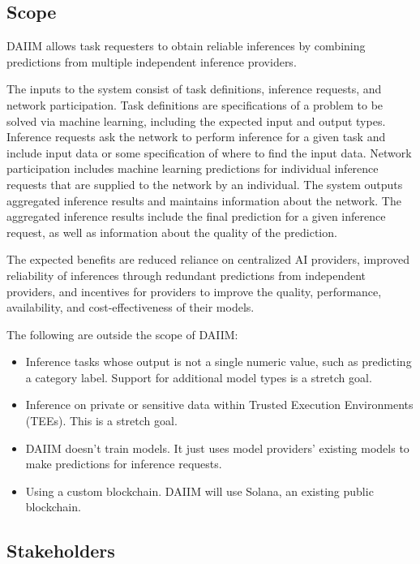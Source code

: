 \documentclass[12pt]{article}
\begin{document}
\subsection{Scope}

DAIIM allows task requesters to obtain reliable inferences by combining predictions from multiple independent inference providers.

The inputs to the system consist of task definitions, inference requests, and network participation.
Task definitions are specifications of a problem to be solved via machine learning, including the expected input and output types.
Inference requests ask the network to perform inference for a given task and include
input data or some specification of where to find the input data.
Network participation includes machine learning
predictions for individual inference requests that are supplied to the network by an individual.
The system outputs aggregated inference results and maintains information about the network.
The aggregated inference results include the final prediction for a given inference request, as well as information about the quality of the prediction.

The expected benefits are reduced reliance on centralized AI providers, improved reliability of inferences through redundant predictions from
independent providers, and incentives for providers to improve the quality, performance, availability, and cost-effectiveness of their models.

The following are outside the scope of DAIIM:
\begin{itemize}
    \item Inference tasks whose output is not a single numeric value, such as predicting a category label. Support for additional model types is a stretch goal.
    \item Inference on private or sensitive data within Trusted Execution Environments (TEEs). This is a stretch goal.
    \item DAIIM doesn't train models. It just uses model providers' existing models to make predictions for inference requests.
    \item Using a custom blockchain. DAIIM will use Solana, an existing public blockchain.
\end{itemize}

\subsection{Stakeholders} \label{sec_Stakeholders}
\end{document}
